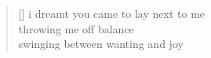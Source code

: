 
\settowidth{}
\begin{verse}[\versewidth]
i dreamt you came to lay next to me \\
throwing me off balance \\
swinging between wanting and joy
\end{verse}
